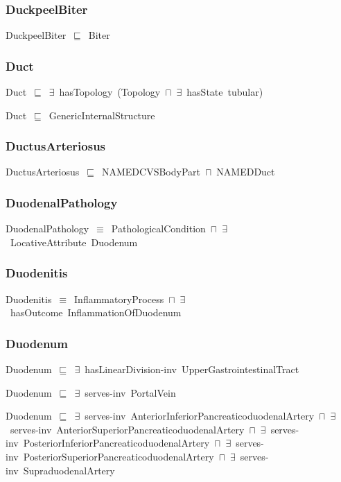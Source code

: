 \documentclass{article}
\begin{document}
\subsubsection*{DuckpeelBiter}

DuckpeelBiter~\ensuremath{\sqsubseteq}~Biter~

\subsubsection*{Duct}

Duct~\ensuremath{\sqsubseteq}~\ensuremath{\exists}~hasTopology~(Topology~\ensuremath{\sqcap}~\ensuremath{\exists}~hasState~tubular)~

Duct~\ensuremath{\sqsubseteq}~GenericInternalStructure~

\subsubsection*{DuctusArteriosus}

DuctusArteriosus~\ensuremath{\sqsubseteq}~NAMEDCVSBodyPart~\ensuremath{\sqcap}~NAMEDDuct~

\subsubsection*{DuodenalPathology}

DuodenalPathology~\ensuremath{\equiv}~PathologicalCondition~\ensuremath{\sqcap}~\ensuremath{\exists}~LocativeAttribute~Duodenum

\subsubsection*{Duodenitis}

Duodenitis~\ensuremath{\equiv}~InflammatoryProcess~\ensuremath{\sqcap}~\ensuremath{\exists}~hasOutcome~InflammationOfDuodenum

\subsubsection*{Duodenum}

Duodenum~\ensuremath{\sqsubseteq}~\ensuremath{\exists}~hasLinearDivision-inv~UpperGastrointestinalTract~

Duodenum~\ensuremath{\sqsubseteq}~\ensuremath{\exists}~serves-inv~PortalVein~

Duodenum~\ensuremath{\sqsubseteq}~\ensuremath{\exists}~serves-inv~AnteriorInferiorPancreaticoduodenalArtery~\ensuremath{\sqcap}~\ensuremath{\exists}~serves-inv~AnteriorSuperiorPancreaticoduodenalArtery~\ensuremath{\sqcap}~\ensuremath{\exists}~serves-inv~PosteriorInferiorPancreaticoduodenalArtery~\ensuremath{\sqcap}~\ensuremath{\exists}~serves-inv~PosteriorSuperiorPancreaticoduodenalArtery~\ensuremath{\sqcap}~\ensuremath{\exists}~serves-inv~SupraduodenalArtery~
\end{document}
